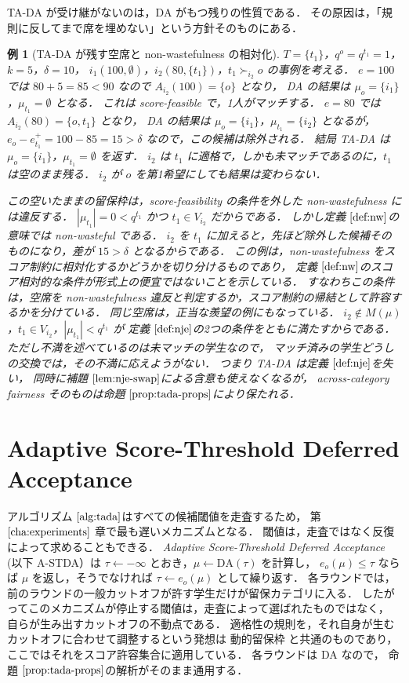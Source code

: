 \documentclass[
    12pt,          %
    a4paper,       %
    oneside,       %
    onecolumn,     %
    titlepage,     %
    final          %
]{jreport} %
\newcommand{\refchapter}[1]{第 $\ref{#1}$ 章}
\newcommand{\refdefinition}[1]{定義 $\ref{#1}$}
\newcommand{\refpropositional}[1]{命題 $\ref{#1}$}
\newcommand{\reflemma}[1]{補題 $\ref{#1}$}
\newcommand{\refalgorithm}[1]{アルゴリズム $\ref{#1}$}
\newtheorem{example}{例}[chapter]
\begin{document}
TA-DA が受け継がないのは，DA がもつ残りの性質である．
その原因は，「規則に反してまで席を埋めない」という方針そのものにある．

\begin{example}[TA-DA が残す空席と non-wastefulness の相対化]
\label{ex:tada-idle}
$T=\{t_1\}$，$q^o=q^{t_1}=1$，$k=5$，$\delta=10$，
$i_1(100,\emptyset)$，$i_2(80,\{t_1\})$，$t_1\succ_{i_2}o$ の事例を考える．
$e=100$ では $80+5=85<90$ なので $A_{i_2}(100)=\{o\}$ となり，
DA の結果は $\mu_o=\{i_1\}$，$\mu_{t_1}=\emptyset$ となる．
これは score-feasible で，1人がマッチする．
$e=80$ では $A_{i_2}(80)=\{o,t_1\}$ となり，
DA の結果は $\mu_o=\{i_1\}$，$\mu_{t_1}=\{i_2\}$ となるが，
$e_o-e_{t_1}^+=100-85=15>\delta$ なので，この候補は除外される．
結局 TA-DA は $\mu_o=\{i_1\}$，$\mu_{t_1}=\emptyset$ を返す．
$i_2$ は $t_1$ に適格で，しかも未マッチであるのに，$t_1$ は空のまま残る．
$i_2$ が $o$ を第1希望にしても結果は変わらない．

この空いたままの留保枠は，score-feasibility の条件を外した non-wastefulness には違反する．
$|\mu_{t_1}|=0<q^{t_1}$ かつ $t_1\in V_{i_2}$ だからである．
しかし\refdefinition{def:nw}の意味では non-wasteful である．
$i_2$ を $t_1$ に加えると，先ほど除外した候補そのものになり，差が $15>\delta$ となるからである．
この例は，non-wastefulness をスコア制約に相対化するかどうかを切り分けるものであり，
\refdefinition{def:nw}のスコア相対的な条件が形式上の便宜ではないことを示している．
すなわちこの条件は，空席を non-wastefulness 違反と判定するか，スコア制約の帰結として許容するかを分けている．
同じ空席は，正当な羨望の例にもなっている．
$i_2\notin M(\mu)$，$t_1\in V_{i_2}$，$|\mu_{t_1}|<q^{t_1}$ が
\refdefinition{def:nje}の2つの条件をともに満たすからである．
ただし不満を述べているのは未マッチの学生なので，
マッチ済みの学生どうしの交換では，その不満に応えようがない．
つまり TA-DA は\refdefinition{def:nje}を失い，
同時に\reflemma{lem:nje-swap}による含意も使えなくなるが，
across-category fairness そのものは\refpropositional{prop:tada-props}により保たれる．
\end{example}

\section{Adaptive Score-Threshold Deferred Acceptance}
\label{sec:astda}

\refalgorithm{alg:tada}はすべての候補閾値を走査するため，
\refchapter{cha:experiments}で最も遅いメカニズムとなる．
閾値は，走査ではなく反復によって求めることもできる．
\emph{Adaptive Score-Threshold Deferred Acceptance}
(以下 A-STDA）は
$\tau\gets-\infty$ とおき，$\mu\gets\mathrm{DA}(\tau)$ を計算し，
$e_o(\mu)\le\tau$ ならば $\mu$ を返し，そうでなければ $\tau\gets e_o(\mu)$ として繰り返す．
各ラウンドでは，前のラウンドの一般カットオフが許す学生だけが留保カテゴリに入る．
したがってこのメカニズムが停止する閾値は，走査によって選ばれたものではなく，
自らが生み出すカットオフの不動点である．
適格性の規則を，それ自身が生むカットオフに合わせて調整するという発想は
動的留保枠 \citep{AyTu20a} と共通のものであり，
ここではそれをスコア許容集合に適用している．
各ラウンドは DA \citep{GaSh62a,Roth08a} なので，
\refpropositional{prop:tada-props}の解析がそのまま通用する．
\end{document}
